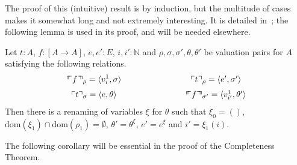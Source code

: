 \documentclass[numreferences]{kluwer}
\newcommand{\nat}{{\mathbb N}}
\newcommand{\mlfnv}[2]{\ensuremath\ulcorner\!\!\ulcorner{#1}\urcorner\!\!\urcorner_{#2}}
\newcommand{\mlfn}[2]{\ensuremath\ulcorner{#1}\urcorner_{#2}}
\newcommand{\domain}{\ensuremath{\mathrm{dom}}}
\newcommand{\renamevar}[2]{\ensuremath{{#1}^{#2}}}
\newcommand{\isrenamevar}[3]{\ensuremath{{#1}=\renamevar{#2}{#3}}}
\newcommand{\idn}{()}
\begin{document}
\begin{article}
The proof of this (intuitive) result is by induction, but the
multitude of cases makes it somewhat long and not extremely
interesting.  It is detailed in~\cite{lcf:wie:04b}; the following lemma
is used in its proof, and will be needed elsewhere.
\begin{lemma}\label{quotecommv1}
Let $t:A$, $f:[A\to A]$, $e,e':E$, $i,i':\nat$ and
$\rho,\sigma,\sigma',\theta,\theta'$ be valuation pairs for $A$
satisfying the following relations.
\[
\begin{array}{ccc}
\displaystyle
\mlfnv{f}{\rho} = \langle v^1_i,\sigma\rangle
 & \hspace{2cm} & \mlfn{t}{\rho} = \langle e',\sigma'\rangle\medskip\\
\mlfn{t}{\sigma} = \langle e,\theta\rangle
 && \mlfnv{f}{\sigma'} = \langle v^1_{i'},\theta'\rangle
\end{array}
\]
Then there is a renaming of variables $\xi$ for $\theta$ such that
$\xi_0=\idn$, $\domain(\xi_1)\cap\domain(\rho_1)=\emptyset$,
{\isrenamevar{\theta'}\theta\xi}, {\isrenamevar{e'}e\xi} and $i'=\xi_1(i)$.
\end{lemma}


The following corollary will be essential in the proof of the Completeness
Theorem.


\end{article}
\end{document}
